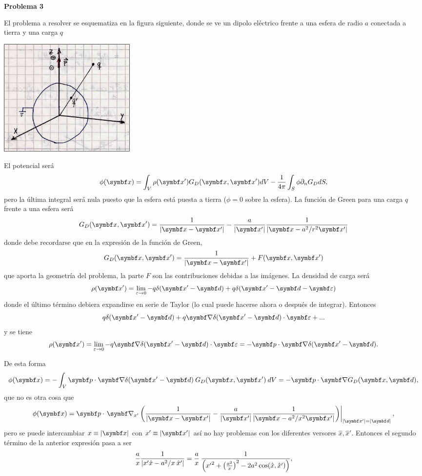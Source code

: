 \documentclass[10pt,oneside]{CBFT_book}
\begin{document}
\begin{ejemplo}{\bf Problema 3}

El problema a resolver se esquematiza en la figura siguiente, donde se ve un dipolo eléctrico
frente a una esfera de radio $a$ conectada a tierra y una carga $q$

\includegraphics[width=0.3\textwidth]{images/fig_ft1_problema3A.jpg}

El potencial será
\[
	\phi(\vbx) = \int_V \rho(\vbx') G_D(\vbx,\vbx') dV - \frac{1}{4\pi}\int_S \phi \partial_n G_D dS,
\]
pero la última integral será nula puesto que la esfera está puesta a tierra ($\phi=0$ sobre la esfera).
La función de Green para una carga $q$ frente a una esfera será
\[
	 G_D(\vbx,\vbx') = \frac{1}{|\vbx-\vbx'|} - \frac{a}{|\vbx'|}\frac{1}{|\vbx - a^2/r^2 \vbx'|}
\]
donde debe recordarse que en la expresión de la función de Green, 
\[
	G_D(\vbx,\vbx') = \frac{1}{|\vbx-\vbx'|} + F(\vbx,\vbx')
\]
que aporta la geometría del problema, la parte $F$ son las contribuciones debidas a las imágenes.
La densidad de carga será
\[
	\rho(\vbx') = \lim_{\varepsilon\to 0} -q \delta(\vbx' - \vb{d}) + q \delta(\vbx' - \vb{d} - \vb{\varepsilon})
\]
donde el último término debiera expandirse en serie de Taylor (lo cual puede hacerse ahora o después
de integrar). Entonces
\[
	q \delta(\vbx' - \vb{d} ) + q \Nabla \delta(\vbx' - \vb{d}) \cdot \vb{\varepsilon} + ...
\]
y se tiene
\[
	\rho(\vbx') =  \lim_{\varepsilon\to 0} - q \Nabla \delta(\vbx' - \vb{d}) \cdot \vb{\varepsilon} =
	- \vb{p} \cdot \Nabla \delta(\vbx' - \vb{d}).
\]

De esta forma 
\[
	\phi(\vbx) = - \int_V  \vb{p} \cdot \Nabla \delta(\vbx' - \vb{d}) \: G_D(\vbx,\vbx') \: dV =
	-  \vb{p} \cdot \Nabla G_D(\vbx,\vb{d}),
\]
que no es otra cosa que 
\[
	\phi(\vbx) =  \vb{p} \cdot \left. \Nabla_{x'} \left( 
	\frac{1}{|\vbx-\vbx'|} - \frac{a}{|\vbx'|}\frac{1}{|\vbx - a^2/x^2 \vbx'|}
	\right) \right|_{|\vbx'|=|\vb{d}|},
\]
pero se puede intercambiar $x\equiv|\vbx|$ con $x'\equiv |\vbx'|$ así no hay problemas con los diferentes
versores $\hat{x},\hat{x}'$.
Entonces el segundo término de la anterior expresión pasa a ser
\[
	\frac{a}{x} \frac{1}{| x'\hat{x}- a^2/x \:\hat{x}'|} =
	\frac{a}{x} \: \frac{1}{ \left( {x'}^2 + \left( \frac{ a^2 }{ x } \right)^2 - 2 a^2 \cos( \hat{x}, \hat{x}') \right)},
\]


\end{ejemplo}
\end{document}
